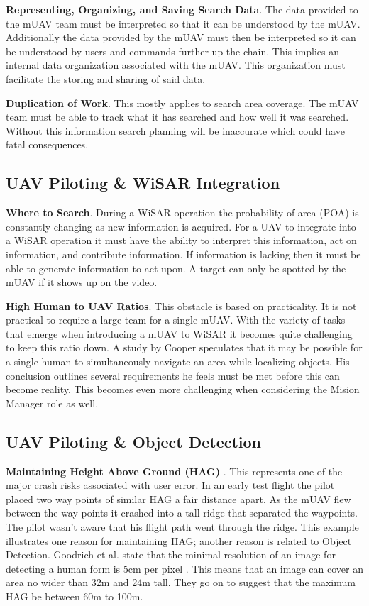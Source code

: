 \documentclass[12pt]{IEEEtran}
\begin{document}
\textbf{Representing, Organizing, and Saving Search Data}.  The data provided to
the mUAV team must be interpreted so that it can be understood by the mUAV.  Additionally the data
provided by the mUAV must then be interpreted so it can be understood by users
and commands further up the chain.  This implies an internal data organization
associated with the mUAV.  This organization must facilitate the storing and
sharing of said data.

\textbf{Duplication of Work}.  This mostly applies to search area coverage. 
The mUAV team must be able to track what it has searched and how well it
was searched.  Without this information search planning will be inaccurate which
could have fatal consequences.

\subsection{UAV Piloting \& WiSAR Integration}

\textbf{Where to Search}.  During a WiSAR
operation the probability of area (POA) \cite{koester2008lostpersons} is
constantly changing as new information is acquired.  For a UAV to integrate into
a WiSAR operation it must have the ability to interpret this information, act on
information, and contribute information.  If information is lacking then it must
be able to generate information to act upon.  A target can only be spotted by
the mUAV if it shows up on the video.

\textbf{High Human to UAV Ratios}.  This obstacle is based on practicality.  It
is not practical to require a large team for a single mUAV.
With the variety of tasks that emerge when introducing a mUAV to WiSAR it
becomes quite challenging to keep this ratio down.  A study by Cooper 
\cite{cooper2008towards, goodrich2009towards} speculates that it may be possible
for a single human to simultaneously navigate an area while localizing objects. 
His conclusion outlines several requirements he feels must be met before this
can become reality.  This becomes even more challenging when considering the
Mision Manager role as well.

\subsection{UAV Piloting \& Object Detection}
\textbf{Maintaining Height Above Ground (HAG)} \cite{adams2007camera}.
This represents one of the major crash risks associated with user error.  In an
early test flight the pilot placed two way points of similar HAG a fair distance
apart.  As the mUAV flew between the way points it crashed into a tall ridge
that separated the waypoints.  The pilot wasn't aware that his flight path went
through the ridge. This example illustrates one reason for maintaining HAG;
another reason is related to Object Detection.
Goodrich et al. state that the minimal resolution
of an image for detecting a human form is 5cm per pixel
\cite{goodrich2008supporting}.  This means that an image can cover an area no wider than
32m and 24m tall.  They go on to suggest that the
maximum HAG be between 60m to 100m.
\end{document}
